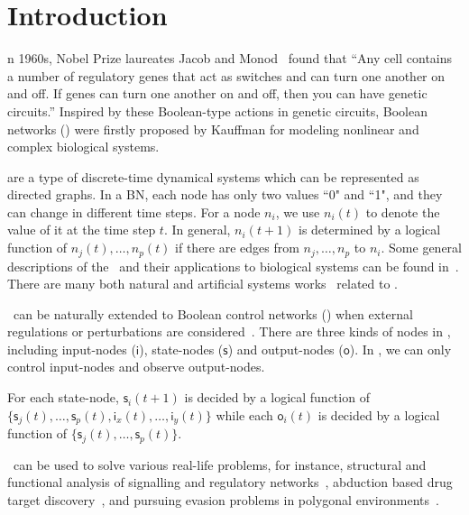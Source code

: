 

\section{Introduction}
\label{sec:intro}


n 1960s, Nobel Prize laureates Jacob and Monod~\cite{Jacob1961Genetic} found that ``Any cell contains a number of regulatory genes that act as switches and can turn one another on and off. If genes can turn one another on and off, then you can have genetic circuits.'' Inspired by these Boolean-type actions in genetic circuits, Boolean networks (\BNs) were firstly proposed by Kauffman \cite{Kauffman1968Metabolic} for modeling nonlinear and complex biological systems. 

{\BNs} are a type of discrete-time dynamical systems which can be represented as directed graphs. In a BN, each node has only two values ``0" and ``1", and they can change in different time steps.  For a node $n_i$, we use $n_i(t)$ to denote the value of it at the time step $t$.
In general, $n_i(t+1)$ is determined by a logical function of $n_j(t),\ldots,n_p(t)$ if  there are  edges from $n_j,\ldots,n_p$ to $n_i$.  
Some general descriptions of the \BNs\ and their applications to biological systems can be found in~\cite{Kauffman1968Metabolic}. There are many both natural and artificial systems works~\cite{Akutsu2000Inferring, Shmulevich2002From, Faur2006Dynamical,Green2007The,Lou2010Multi} related to \BNs.
 

\BNs\ can be naturally extended to Boolean control networks (\BCNs) when external regulations or perturbations are considered~\cite{Ideker2001A}. There are three kinds of nodes in \BCNs, including input-nodes ($\mathsf{i}$), state-nodes ($\mathsf{s}$) and output-nodes ($\mathsf{o}$). In \BCNs, we can only control input-nodes and observe output-nodes. 

For each state-node, $\mathsf{s}_i(t+1)$ is decided by a logical function of  $\{\mathsf{s}_j(t),\ldots,\mathsf{s}_p(t),\mathsf{i}_x(t),\ldots,\mathsf{i}_y(t)\}$  %
while each $\mathsf{o}_i(t)$ is decided by a logical function of   $\{\mathsf{s}_j(t),\ldots,\mathsf{s}_p(t)\}$. 

\BCNs\ can be used to solve various real-life problems, for instance, 
structural and functional analysis of signalling and regulatory networks~\cite{Kaufman1999A, Klamt2006A}, 
abduction based drug target discovery~\cite{Biane2017Abduction}, 
and pursuing evasion problems in polygonal environments~\cite{Thunberg2011A}. 

